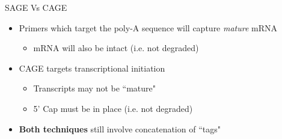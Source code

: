 \documentclass[aspectratio=169,11pt]{beamer}
\begin{document}
\begin{frame}{SAGE Vs CAGE}

	\begin{itemize}
		\item Primers which target the poly-A sequence will capture \textit{mature} mRNA
		\begin{itemize}
			\item mRNA will also be intact (i.e. not degraded)
		\end{itemize}
		\item CAGE targets transcriptional initiation
		\begin{itemize}
			\item Transcripts may not be ``mature"
			\item 5' Cap must be in place (i.e. not degraded)
		\end{itemize}
		\item \textbf{Both techniques} still involve concatenation of ``tags"
	\end{itemize}

\end{frame}
\end{document}
